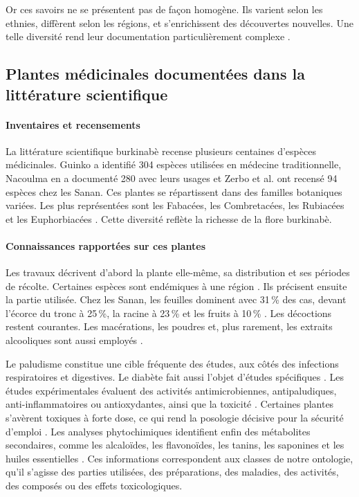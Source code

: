 Or ces savoirs ne se présentent pas de façon homogène. Ils varient selon les ethnies, diffèrent selon les régions, et s'enrichissent des découvertes nouvelles. Une telle diversité rend leur documentation particulièrement complexe \cite{millogo2001}.

\subsection{Plantes médicinales documentées dans la littérature scientifique}
\label{subsec:plantes_documentees}

\paragraph{Inventaires et recensements}
La littérature scientifique burkinabè recense plusieurs centaines d'espèces médicinales. Guinko \cite{guinko1984} a identifié 304 espèces utilisées en médecine traditionnelle, Nacoulma \cite{nacoulma1996} en a documenté 280 avec leurs usages et Zerbo et al. \cite{zerbo_plantes_2011} ont recensé 94 espèces chez les Sanan. Ces plantes se répartissent dans des familles botaniques variées. Les plus représentées sont les Fabacées, les Combretacées, les Rubiacées et les Euphorbiacées \cite{nacoulma1996}. Cette diversité reflète la richesse de la flore burkinabè.

\paragraph{Connaissances rapportées sur ces plantes}
Les travaux décrivent d'abord la plante elle-même, sa distribution et ses périodes de récolte. Certaines espèces sont endémiques à une région \cite{guinko1984}. Ils précisent ensuite la partie utilisée. Chez les Sanan, les feuilles dominent avec 31\,\% des cas, devant l'écorce du tronc à 25\,\%, la racine à 23\,\% et les fruits à 10\,\% \cite{zerbo_plantes_2011}. Les décoctions restent courantes. Les macérations, les poudres et, plus rarement, les extraits alcooliques sont aussi employés \cite{nacoulma1996}.

Le paludisme constitue une cible fréquente des études, aux côtés des infections respiratoires et digestives. Le diabète fait aussi l'objet d'études spécifiques \cite{sempore_potential_2021}. Les études expérimentales évaluent des activités antimicrobiennes, antipaludiques, anti-inflammatoires ou antioxydantes, ainsi que la toxicité \cite{nacoulma1996, ouedraogo_revue_2024, konate_toxicity_2012}. Certaines plantes s'avèrent toxiques à forte dose, ce qui rend la posologie décisive pour la sécurité d'emploi \cite{nacoulma1996}. Les analyses phytochimiques identifient enfin des métabolites secondaires, comme les alcaloïdes, les flavonoïdes, les tanins, les saponines et les huiles essentielles \cite{zongo2025, ouedraogo_revue_2024}. Ces informations correspondent aux classes de notre ontologie, qu'il s'agisse des parties utilisées, des préparations, des maladies, des activités, des composés ou des effets toxicologiques.


